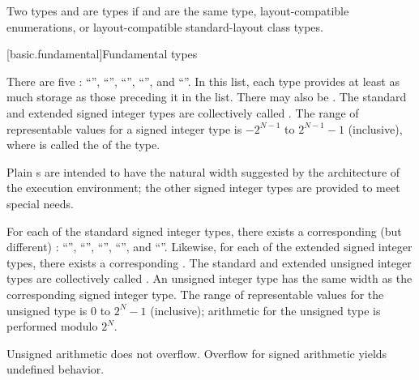 \pnum
{}%
Two types   and   are
 types
if  and  are the same type,
layout-compatible enumerations, or
layout-compatible standard-layout class types.

[basic.fundamental]{Fundamental types}

\pnum
{}%
%
There are five  :
%
%
%
%
%
``'', ``'', ``'',
``'', and ``''. In
this list, each type provides at least as much storage as those
preceding it in the list.
%
%
There may also be 
.
The standard and extended signed integer types are collectively called
.
The range of representable values for a signed integer type is
$-2^{N-1}$ to $2^{N-1}-1$ (inclusive),
where  is called the  of the type.
%
\begin{note}
Plain s are intended to have
the natural width suggested by the architecture of the execution environment;
the other signed integer types are provided to meet special needs.
\end{note}

\pnum
{}%
%
For each of the standard signed integer types,
there exists a corresponding (but different)
%
:
%
%
%
%
%
``'', ``'',
``'', ``'', and
``''.
%
Likewise, for each of the extended signed integer types,
there exists a corresponding .
The standard and extended unsigned integer types
are collectively called .
An unsigned integer type has the same width 
as the corresponding signed integer type.
%
The range of representable values for the unsigned type is
$0$ to $2^N-1$ (inclusive);
arithmetic for the unsigned type is performed modulo $2^N$.
\begin{note}
Unsigned arithmetic does not overflow.
Overflow for signed arithmetic yields undefined behavior.
\end{note}

